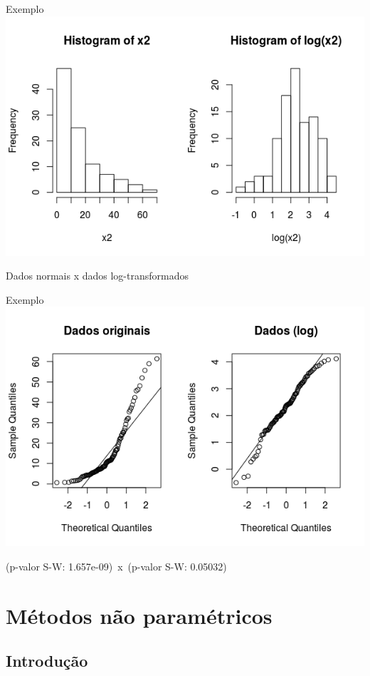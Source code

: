 \documentclass{beamer}
\begin{document}
\begin{frame}{\scriptsize Exemplo}
  \centering
  \includegraphics[width=\textwidth]{Cap37-38/transf-h}

  \footnotesize
Dados normais x dados log-transformados
\end{frame}

\begin{frame}{\scriptsize Exemplo}
  \centering
  \includegraphics[width=\textwidth]{Cap37-38/transf-qq}

  \footnotesize
(p-valor S-W: 1.657e-09)\ x\ (p-valor S-W: 0.05032)
\end{frame}

\section{Métodos não paramétricos}

\subsection[Intro]{Introdução}
\end{document}
